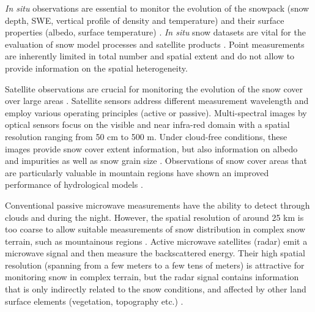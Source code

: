 \documentclass[hydrology,article,submit,moreauthors,pdftex]{Definitions/mdpi}
\begin{document}
\textit{In situ} observations are essential to monitor the evolution of the snowpack (snow depth, SWE, vertical profile of density and temperature) and their surface properties (albedo, surface temperature) \citep{Morin_2012,Lejeune_2018}. \textit{In situ} snow datasets are vital for the evaluation of snow model processes and satellite products \citep{Brun_1992,Vionnet_2012,Krinner_2018}. Point measurements are inherently limited in total number and spatial extent and do not allow to provide information on the spatial heterogeneity.%


Satellite observations are crucial for monitoring the evolution of the snow cover over large areas \cite{DeLannoy_2012}. Satellite sensors address different measurement wavelength and employ various operating principles (active or passive). Multi-spectral images by optical sensors focus on the visible and near infra-red domain with a spatial resolution ranging from 50 cm to 500 m. Under cloud-free conditions, these images provide snow cover extent information, but also information on albedo and impurities as well as snow grain size \cite{Hall_1995,Hall_2007,Dietz_2012,Gascoin_2015}. Observations of snow cover areas that are particularly valuable in mountain regions have shown an improved performance of hydrological models \cite{Lee_2005,Immerzeel_2009,Finger_2015}.

Conventional passive microwave measurements have the ability to detect through clouds and during the night. However, the  spatial resolution of around 25 km is too coarse to allow suitable measurements of snow distribution in complex snow terrain, such as mountainous regions \cite{Foster_2005,Cordisco_2006,Tedesco_2010,Li_2014}. Active microwave satellites (radar) emit a microwave signal and then measure the backscattered energy. Their high spatial resolution (spanning from a few meters to a few tens of meters) is attractive for monitoring snow in complex terrain, but the radar signal contains information that is only indirectly related to the snow conditions, and affected by other land surface elements (vegetation, topography etc.) \cite{DeLannoy_2012,Conde_2019}.
\end{document}
